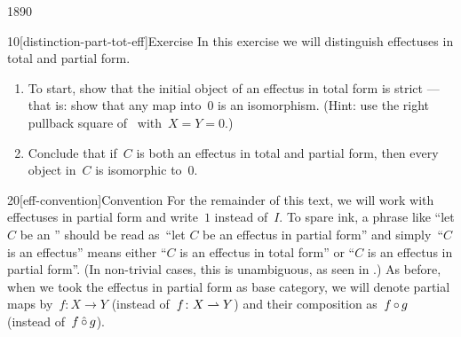 \begin{parsec}{1890}%
\begin{point}{10}[distinction-part-tot-eff]{Exercise}%
In this exercise we will
    distinguish effectuses in total and partial form.
\begin{enumerate}
\item
To start, show that the initial object of an effectus in total form is strict
    --- that is: show that any map into~$0$ is an isomorphism.
    (Hint: use the right pullback square of~
        with~$X=Y=0$.)
\item
Conclude that if~$C$ is both an effectus in total and partial form,
then every object in~$C$ is isomorphic to~$0$.
\end{enumerate}
\end{point}
\begin{point}{20}[eff-convention]{Convention}%
For the remainder of this text, we will work with effectuses in partial form
    and write~$1$ instead of~$I$.
To spare ink, a phrase like ``let $C$ be an ''
should be read as~``let $C$ be an effectus in partial form''
and simply~``$C$ is an effectus'' means either ``$C$ is an effectus in total form''
    or ``$C$ is an effectus in partial form''.
(In non-trivial cases, this
    is unambiguous, as seen in .)
As before, when we took the effectus in partial form as base category,
    we will denote partial maps by~$f\colon X \to Y$
    (instead of~$f\colon X \rightharpoonup Y$)
        and their composition as~$f \mathop{\circ} g$
        (instead of~$f \mathop{\hat\circ} g$).
\end{point}
\end{parsec}

